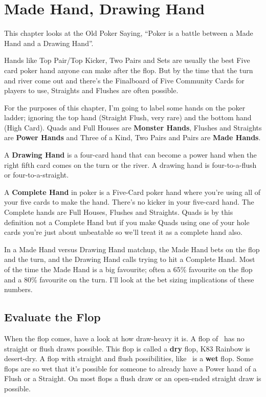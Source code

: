 \chapter{Made Hand, Drawing Hand}


This chapter looks at the Old Poker Saying, ``Poker
is a battle between a Made Hand and a Drawing Hand''.

Hands like Top Pair/Top Kicker, Two Pairs and Sets
are usually the best Five card poker hand anyone can
make after the flop. But by the time that the turn and river come out and
there's the Finalboard of Five Community Cards for players to use, Straights
and Flushes are often possible.

For the purposes of this chapter, I'm going to label some hands on the
poker ladder; ignoring the top hand (Straight Flush, very rare) and
the bottom hand (High Card). Quads and Full Houses are \textbf{Monster
Hands}, Flushes and Straights are \textbf{Power Hands} and Three of a
Kind, Two Pairs and Pairs are \textbf{Made Hands}.

A \textbf{Drawing Hand} is a four-card hand that can become a power hand
when the right fifth card comes on the turn or the river. A drawing hand
is four-to-a-flush or four-to-a-straight.

A \textbf{Complete Hand} in poker is a Five-Card poker hand where
you're using all of your five cards to make the hand. There's no
kicker in your five-card hand. The Complete hands are Full Houses,
Flushes and Straights. Quads is by this definition not a Complete Hand
but if you make Quads using one of your hole cards you're just about
unbeatable so we'll treat it as a complete hand also.


In a Made Hand versus Drawing Hand matchup, the Made Hand bets on the
flop and the turn, and the Drawing Hand calls trying to hit a
Complete Hand. Most of the time the Made Hand is a big favourite;
often a 65\% favourite on the flop and a 80\% favourite on the
turn. I'll look at the bet sizing implications of these numbers.

\section{Evaluate the Flop}

When the flop comes, have a look at how draw-heavy it is. A flop of
\Ks\eigh\trec\ has no straight or flush draws possible. This flop is
called a \textbf{dry} flop, K83 Rainbow is desert-dry. A flop with
straight and flush possibilities, like \tend\nined\sixc\ is a
\textbf{wet} flop. Some flops are so wet that it's possible for
someone to already have a Power hand of a Flush or a Straight. On most
flops a flush draw or an open-ended straight draw is possible.

